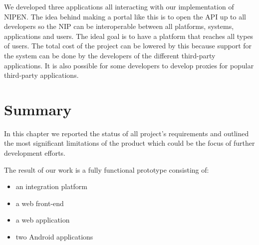 We developed three applications all interacting with our implementation of NIPEN. 
The idea behind making a portal like this is to open the API up to all developers so the NIP can be interoperable between all platforms, systems, applications and users. 
The ideal goal is to have a platform that reaches all types of users. 
The total cost of the project can be lowered by this because support for the system can be done by the developers of the different third-party applications. 
It is also possible for some developers to develop proxies for popular third-party applications.
\fi

\section{Summary}
In this chapter we reported the status of all project's requirements and outlined the most significant
limitations of the product which could be the focus of further development efforts.

The result of our work is a fully functional prototype consisting of:
\begin{itemize}
\item an integration platform
\item a web front-end
\item a web application
\item two Android applications
\end{itemize}

\iffalse
We are glad we managed to implement every requirement 
meaning we made a realistic assumptions of what we could accomplish in the given time with the members we had.
This project is an interesting idea and finding a way to unify the collection of health data of citizens will lead to a better understanding of citizen health and to an overview of what can be improved for a better quality of life. 
\fi